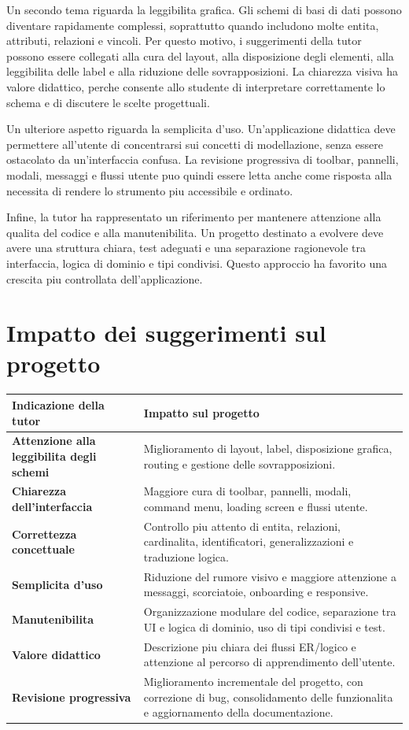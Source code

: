 Un secondo tema riguarda la leggibilita grafica. Gli schemi di basi di dati possono diventare rapidamente complessi, soprattutto quando includono molte entita, attributi, relazioni e vincoli. Per questo motivo, i suggerimenti della tutor possono essere collegati alla cura del layout, alla disposizione degli elementi, alla leggibilita delle label e alla riduzione delle sovrapposizioni. La chiarezza visiva ha valore didattico, perche consente allo studente di interpretare correttamente lo schema e di discutere le scelte progettuali.

Un ulteriore aspetto riguarda la semplicita d'uso. Un'applicazione didattica deve permettere all'utente di concentrarsi sui concetti di modellazione, senza essere ostacolato da un'interfaccia confusa. La revisione progressiva di toolbar, pannelli, modali, messaggi e flussi utente puo quindi essere letta anche come risposta alla necessita di rendere lo strumento piu accessibile e ordinato.

Infine, la tutor ha rappresentato un riferimento per mantenere attenzione alla qualita del codice e alla manutenibilita. Un progetto destinato a evolvere deve avere una struttura chiara, test adeguati e una separazione ragionevole tra interfaccia, logica di dominio e tipi condivisi. Questo approccio ha favorito una crescita piu controllata dell'applicazione.

\section{Impatto dei suggerimenti sul progetto}

\noindent\begin{tabularx}{\textwidth}{>{\bfseries}p{4cm}X}
Indicazione della tutor & Impatto sul progetto \\
\hline
Attenzione alla leggibilita degli schemi & Miglioramento di layout, label, disposizione grafica, routing e gestione delle sovrapposizioni. \\
Chiarezza dell'interfaccia & Maggiore cura di toolbar, pannelli, modali, command menu, loading screen e flussi utente. \\
Correttezza concettuale & Controllo piu attento di entita, relazioni, cardinalita, identificatori, generalizzazioni e traduzione logica. \\
Semplicita d'uso & Riduzione del rumore visivo e maggiore attenzione a messaggi, scorciatoie, onboarding e responsive. \\
Manutenibilita & Organizzazione modulare del codice, separazione tra UI e logica di dominio, uso di tipi condivisi e test. \\
Valore didattico & Descrizione piu chiara dei flussi ER/logico e attenzione al percorso di apprendimento dell'utente. \\
Revisione progressiva & Miglioramento incrementale del progetto, con correzione di bug, consolidamento delle funzionalita e aggiornamento della documentazione. \\
\end{tabularx}


